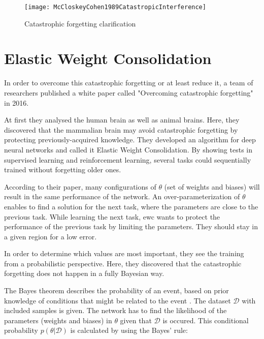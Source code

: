 \begin{figure}[H]
    \centering
    \texttt{[image: McCloskeyCohen1989CatastropicInterference]}
    \caption{\cite[page 148]{psychology_learning_mccloskey_cohen} Catastrophic forgetting clarification}
    \label{fig:catastrophic_forgetting_clarification}
\end{figure}

\section{Elastic Weight Consolidation}
\label{foundation_ewc}

In order to overcome this catastrophic forgetting or at least reduce it, a team of researchers published a white paper called "Overcoming catastrophic forgetting" in 2016.
\cite{elastic-weight-consolidation}

At first they analysed the human brain as well as animal brains.
Here, they discovered that the mammalian brain may avoid catastrophic forgetting by protecting previously-acquired knowledge.
They developed an algorithm for deep neural networks and called it Elastic Weight Consolidation.
By showing tests in supervised learning and reinforcement learning, several tasks could sequentially trained without forgetting older ones.
\cite{elastic-weight-consolidation}

According to their paper, many configurations of $\theta$ (set of weights and biases) will result in the same performance of the network.
An over-parameterization of $\theta$ enables to find a solution for the next task, where the parameters are close to the previous task.
While learning the next task, \acrshort{ewc} wants to protect the performance of the previous task by limiting the parameters.
They should stay in a given region for a low error.
\cite{elastic-weight-consolidation}

In order to determine which values are most important, they see the training from a probabilistic perspective.
Here, they discovered that the catastrophic forgetting does not happen in a fully Bayesian way.
\cite{elastic-weight-consolidation}


The Bayes theorem describes the probability of an event, based on prior knowledge of conditions that might be related to the event \cite{Bayes_theorem}. \cite{elastic-weight-consolidation, schaeffer_ewc}
\newline
The dataset $\mathcal{D}$ with included samples is given.
The network has to find the likelihood of the parameters (weights and biases) in $\theta$ given that $\mathcal{D}$ is occured.
This conditional probability $p \left(\theta | \mathcal{D} \right)$ is calculated by using the Bayes' rule: \cite{elastic-weight-consolidation, schaeffer_ewc}

